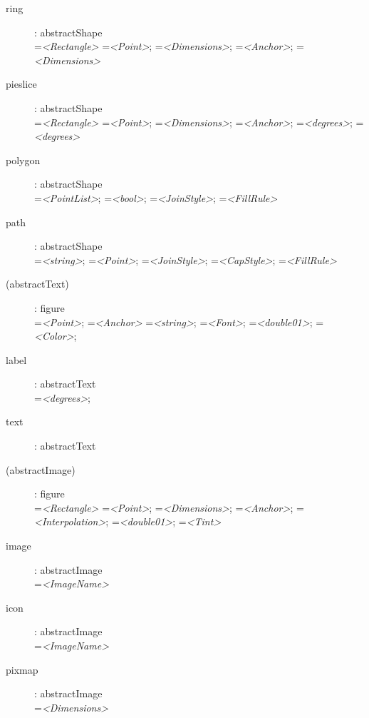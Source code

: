 \begin{flushleft}
\begin{description}
\item[ring]: abstractShape \\
    =\textit{<Rectangle>}
    =\textit{<Point>};
    =\textit{<Dimensions>};
    =\textit{<Anchor>};
    =\textit{<Dimensions>}

\item[pieslice]: abstractShape \\
    =\textit{<Rectangle>}
    =\textit{<Point>};
    =\textit{<Dimensions>};
    =\textit{<Anchor>};
    =\textit{<degrees>};
    =\textit{<degrees>}

\item[polygon]: abstractShape \\
    =\textit{<PointList>};
    =\textit{<bool>};
    =\textit{<JoinStyle>};
    =\textit{<FillRule>}

\item[path]: abstractShape \\
    =\textit{<string>};
    =\textit{<Point>};
    =\textit{<JoinStyle>};
    =\textit{<CapStyle>};
    =\textit{<FillRule>}

\item[(abstractText)]: figure \\
    =\textit{<Point>};
    =\textit{<Anchor>}
    =\textit{<string>};
    =\textit{<Font>};
    =\textit{<double01>};
    =\textit{<Color>};

\item[label]: abstractText \\
    =\textit{<degrees>};

\item[text]: abstractText

\item[(abstractImage)]: figure \\
    =\textit{<Rectangle>}
    =\textit{<Point>};
    =\textit{<Dimensions>};
    =\textit{<Anchor>};
    =\textit{<Interpolation>};
    =\textit{<double01>};
    =\textit{<Tint>}

\item[image]: abstractImage \\
    =\textit{<ImageName>}

\item[icon]: abstractImage \\
    =\textit{<ImageName>}

\item[pixmap]: abstractImage \\
    =\textit{<Dimensions>}

\end{description}
\end{flushleft}


